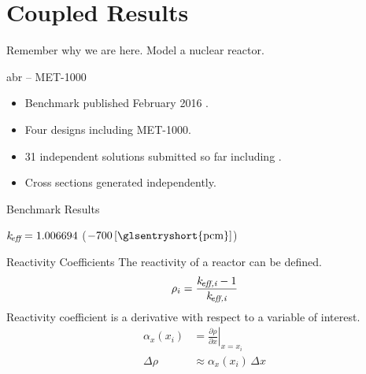 \section{Coupled Results}
\label{sec:coupledResults}

\begin{frame}{Remember why we are here.}
  \pause
  \huge Model a nuclear reactor.
\end{frame}

\begin{frame}{\gls{abr} -- MET-1000}
  \begin{itemize}
    \item Benchmark published February 2016 \cite{abr}.
    \item Four designs including MET-1000.
    \item 31 independent solutions submitted so far including \dif.
    \item Cross sections generated independently.
  \end{itemize}
\end{frame}

\begin{frame}{Benchmark Results}
  \vspace{-0.2in}
  \begin{figure}
    \centering
    \hspace{1in}
  \end{figure}
  \vspace{-0.1in}
  \begin{center}
    $k_{\!\mbox{\scriptsize \em eff}} =  1.006694 $ \quad (\dif $-700\units{\glsentryshort{pcm}}$)
  \end{center}
\end{frame}

\begin{frame}{Reactivity Coefficients}
  The reactivity of a reactor can be defined.
  \begin{equation}
    \label{eq:reactivity}
    \rho_i = \frac{k_{\!\mbox{\scriptsize \em eff,{i}}} - 1}{k_{\!\mbox{\scriptsize \em eff,{i}}}}
  \end{equation}
  Reactivity coefficient is a derivative with respect to a variable of interest.
  \begin{align}
    \label{eq:reactivity_coefficient}
    \alpha_x(x_i) &= \left. \frac{\partial \rho}{\partial x} \right|_{x=x_i} \\
    \Delta \rho &\approx \alpha_x(x_i) \, \Delta x
  \end{align}
\end{frame}


